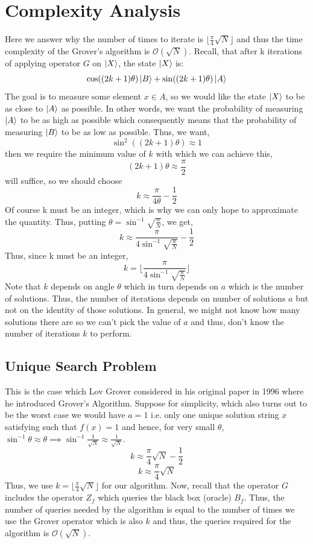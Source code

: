 \section{Complexity Analysis}\label{sec:Complexity Analysis_Grover}Here we answer why the number of times to iterate is $\lfloor \frac{\pi}{4}\sqrt{N} \rfloor$ and thus the time complexity of the Grover's algorithm is $\mathcal{O}(\sqrt{N})$. Recall, that after k iterations of applying operator $G$ on $\ket{X}$, the state $\ket{X}$ is:
\[
\cos ((2k+1)\theta) \ket{B} + \sin ((2k+1)\theta)\ket{A}
\]
The goal is to measure some element $x \in A$, so we would like the state $\ket{X}$ to be as close to $\ket{A}$ as possible. In other words, we want the probability of measuring $\ket{A}$ to be as high as possible which consequently means that the probability of measuring $\ket{B}$ to be as low as possible. Thus, we want,
\[
\sin^2 ((2k+1)\theta) \approx 1
\]
then we require the minimum value of $k$ with which we can achieve this,
\[
(2k+1)\theta \approx \frac{\pi}{2}
\]
will suffice, so we should choose
\[
k \approx \frac{\pi}{4\theta}-\frac{1}{2}
\]
Of course k must be an integer, which is why we can only hope to approximate the quantity. Thus, putting $\theta = \sin^{-1} \sqrt{\frac{a}{N}}$, we get,
\[
k \approx \frac{\pi}{4 \sin^{-1} \sqrt{\frac{a}{N}}} - \frac{1}{2}
\]
Thus, since k must be an integer,
\[
k = \lfloor \frac{\pi}{4 \sin^{-1} \sqrt{\frac{a}{N}}} \rfloor
\]
Note that $k$ depends on angle $\theta$ which in turn depends on $a$ which is the number of solutions. Thus, the number of iterations depends on number of solutions $a$ but not on the identity of those solutions. In general, we might not know how many solutions there are so we can't pick the value of $a$ and thus, don't know the number of iterations $k$ to perform.
\subsection{Unique Search Problem}
This is the case which Lov Grover considered in his original paper in 1996 where he introduced Grover's Algorithm. Suppose for simplicity, which also turns out to be the worst case we would have $a=1$ i.e. only one unique solution string $x$ satisfying such that $f(x)=1$ and hence, for very small $\theta$, $\sin^{-1} \theta \approx \theta \implies \sin^{-1}\frac{1}{\sqrt{N}} \approx \frac{1}{\sqrt{N}}$.
\[
k \approx \frac{\pi}{4}\sqrt{N} -\frac{1}{2}
\]
\[
k \approx \frac{\pi}{4}\sqrt{N}
\]
Thus, we use $k=\lfloor \frac{\pi}{4}\sqrt{N} \rfloor$ for our algorithm. Now, recall that the operator $G$ includes the operator $Z_f$ which queries the black box (oracle) $B_f$. Thus, the number of queries needed by the algorithm is equal to the number of times we use the Grover operator which is also $k$ and thus, the queries required for the algorithm is $\mathcal{O}(\sqrt{N})$.


